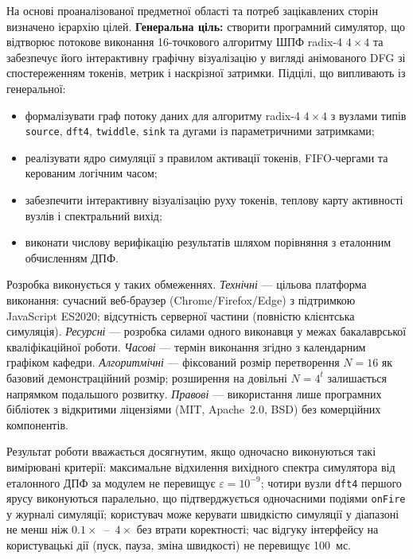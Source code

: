 На основі проаналізованої предметної області та потреб зацікавлених
сторін визначено ієрархію цілей. \textbf{Генеральна ціль:} створити
програмний симулятор, що відтворює потокове виконання 16-точкового
алгоритму ШПФ radix-4 \(4 \times 4\) та забезпечує його інтерактивну
графічну візуалізацію у вигляді анімованого DFG зі спостереженням
токенів, метрик і наскрізної затримки. Підцілі, що випливають із
генеральної:

\begin{itemize}
\item
  формалізувати граф потоку даних для алгоритму radix-4 \(4 \times 4\) з
  вузлами типів \texttt{source}, \texttt{dft4}, \texttt{twiddle},
  \texttt{sink} та дугами із параметричними затримками;
\item
  реалізувати ядро симуляції з правилом активації токенів, FIFO-чергами
  та керованим логічним часом;
\item
  забезпечити інтерактивну візуалізацію руху токенів, теплову карту
  активності вузлів і спектральний вихід;
\item
  виконати числову верифікацію результатів шляхом порівняння з еталонним
  обчисленням ДПФ.
\end{itemize}

Розробка виконується у таких обмеженнях. \emph{Технічні} --- цільова
платформа виконання: сучасний веб-браузер (Chrome/Firefox/Edge) з
підтримкою JavaScript ES2020; відсутність серверної частини (повністю
клієнтська симуляція). \emph{Ресурсні} --- розробка силами одного
виконавця у межах бакалаврської кваліфікаційної роботи. \emph{Часові}
--- термін виконання згідно з календарним графіком кафедри.
\emph{Алгоритмічні} --- фіксований розмір перетворення \(N = 16\) як
базовий демонстраційний розмір; розширення на довільні \(N = 4^{t}\)
залишається напрямком подальшого розвитку. \emph{Правові} ---
використання лише програмних бібліотек з відкритими ліцензіями (MIT,
Apache~2.0, BSD) без комерційних компонентів.

Результат роботи вважається досягнутим, якщо одночасно виконуються такі
вимірювані критерії: максимальне відхилення вихідного спектра симулятора
від еталонного ДПФ за модулем не перевищує \(\varepsilon = 10^{- 9}\);
чотири вузли \texttt{dft4} першого ярусу виконуються паралельно, що
підтверджується одночасними подіями \texttt{onFire} у журналі симуляції;
користувач може керувати швидкістю симуляції у діапазоні не менш ніж
\(0.1 \times\)~--~\(4 \times\) без втрати коректності; час відгуку
інтерфейсу на користувацькі дії (пуск, пауза, зміна швидкості) не
перевищує 100~мс.

